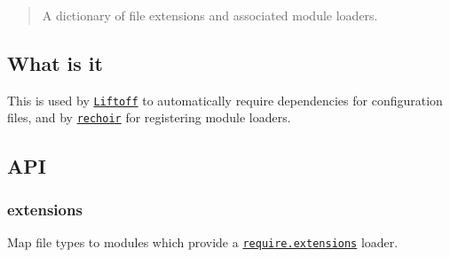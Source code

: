 \begin{quote}
A dictionary of file extensions and associated module loaders. \end{quote}


\href{https://nodei.co/npm/interpret/}{\tt }

\subsection*{What is it}

This is used by \href{http://github.com/tkellen/node-liftoff}{\tt Liftoff} to automatically require dependencies for configuration files, and by \href{http://github.com/tkellen/node-rechoir}{\tt rechoir} for registering module loaders.

\subsection*{A\+PI}

\subsubsection*{extensions}

Map file types to modules which provide a \href{http://nodejs.org/api/globals.html#globals_require_extensions}{\tt require.\+extensions} loader.


